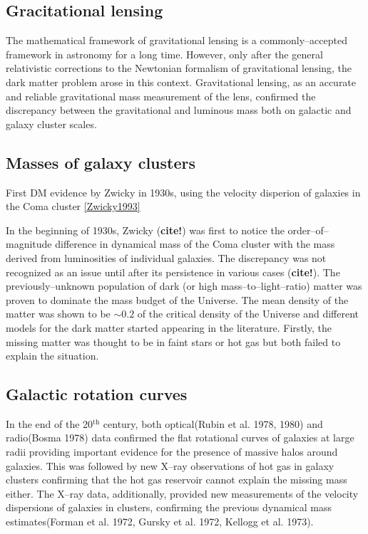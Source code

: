 \documentclass[paper=a4, fontsize=11pt]{scrartcl} %
\numberwithin{equation}{section} %
\numberwithin{figure}{section} %
\numberwithin{table}{section} %
\newcommand{\ignore}[1]{}
\begin{document}
\subsection{Gracitational lensing}
The mathematical framework of gravitational lensing is a commonly--accepted framework in astronomy for a long time. However, only after the general relativistic corrections to the Newtonian formalism of gravitational lensing, the dark matter problem arose in this context. Gravitational lensing, as an accurate and reliable gravitational mass measurement of the lens, confirmed the discrepancy between the gravitational and luminous mass both on galactic and galaxy cluster scales.

\subsection{Masses of galaxy clusters}
First DM evidence by Zwicky in 1930s, using the velocity disperion of galaxies in the Coma cluster \ref{Zwicky1993}

In the beginning of 1930s, Zwicky ({\bf cite!}) was first to notice the order--of--magnitude difference in dynamical mass of the Coma cluster with the mass derived from luminosities of individual galaxies. The discrepancy was not recognized as an issue until after its persistence in various cases ({\bf cite!})\ignore{cite Kahn \& Woltjer 1959 about the Andromeda's negative redshift and masses of galaxy groups Holmberg 1937! or rather just focus on rotational curve discrepancies whose agreement needs a new population of stars tenfold the regular ones in the galaxy with very large M/L  Einasto et al. 1974 ans Ostriker et al. 1974}. The previously--unknown population of dark (or high mass--to--light--ratio) matter was proven to dominate the mass budget of the Universe. The mean density of the matter was shown to be $\sim 0.2$ of the critical density of the Universe and different models for the dark matter started appearing in the literature. Firstly, the missing matter was thought to be in faint stars or hot gas but both failed to explain the situation\ignore{cite and explain why! or maybe not as it's not really important now!!}.

\subsection{Galactic rotation curves}
In the end of the 20$^\mathrm{th}$ century, both optical(Rubin et al. 1978, 1980) and radio(Bosma 1978) data confirmed the flat rotational curves of galaxies at large radii providing important evidence for the presence of massive halos around galaxies. This was followed by new X--ray observations of hot gas in galaxy clusters confirming that the hot gas reservoir cannot explain the missing mass either. The X--ray data, additionally, provided new measurements of the velocity dispersions of galaxies in clusters, confirming the previous dynamical mass estimates(Forman et al. 1972, Gursky et al. 1972, Kellogg et al. 1973). 
\end{document}
